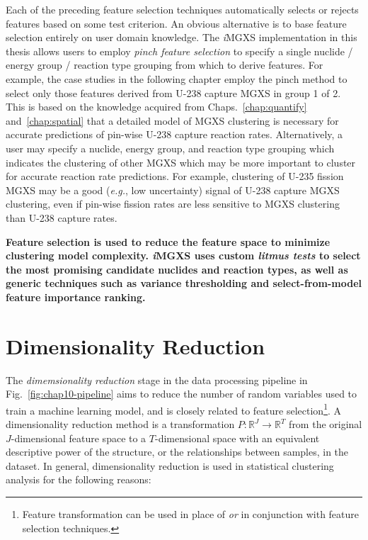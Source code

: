 Each of the preceding feature selection techniques automatically selects or rejects features based on some test criterion. An obvious alternative is to base feature selection entirely on user domain knowledge. The \textit{i}\ac{MGXS} implementation in this thesis allows users to employ \textit{pinch feature selection} to specify a single nuclide / energy group / reaction type grouping from which to derive features. For example, the case studies in the following chapter employ the pinch method to select only those features derived from U-238 capture \ac{MGXS} in group 1 of 2. This is based on the knowledge acquired from Chaps.~\ref{chap:quantify} and~\ref{chap:spatial} that a detailed model of \ac{MGXS} clustering is necessary for accurate predictions of pin-wise U-238 capture reaction rates. Alternatively, a user may specify a nuclide, energy group, and reaction type grouping which indicates the clustering of other \ac{MGXS} which may be more important to cluster for accurate reaction rate predictions. For example, clustering of U-235 fission \ac{MGXS} may be a good (\textit{e.g.}, low uncertainty) signal of U-238 capture \ac{MGXS} clustering, even if pin-wise fission rates are less sensitive to \ac{MGXS} clustering than U-238 capture rates.


\begin{emphbox}
\textbf{Feature selection is used to reduce the feature space to minimize clustering model complexity. \textit{i}\ac{MGXS} uses custom \textit{litmus tests} to select the most promising candidate nuclides and reaction types, as well as generic techniques such as variance thresholding and select-from-model feature importance ranking.}
\end{emphbox}


\section{Dimensionality Reduction}
\label{sec:chap10-dimension-reduce}

The \textit{dimemsionality reduction} stage in the data processing pipeline in Fig.~\ref{fig:chap10-pipeline} aims to reduce the number of random variables used to train a machine learning model, and is closely related to feature selection\footnote{Feature transformation can be used in place of \textit{or} in conjunction with feature selection techniques.}. A dimensionality reduction method is a transformation $P: \mathbb{R}^{J} \rightarrow \mathbb{R}^{T}$ from the original $J$-dimensional feature space to a $T$-dimensional space with an equivalent descriptive power of the structure, or the relationships between samples, in the dataset. In general, dimensionality reduction is used in statistical clustering analysis for the following reasons:

